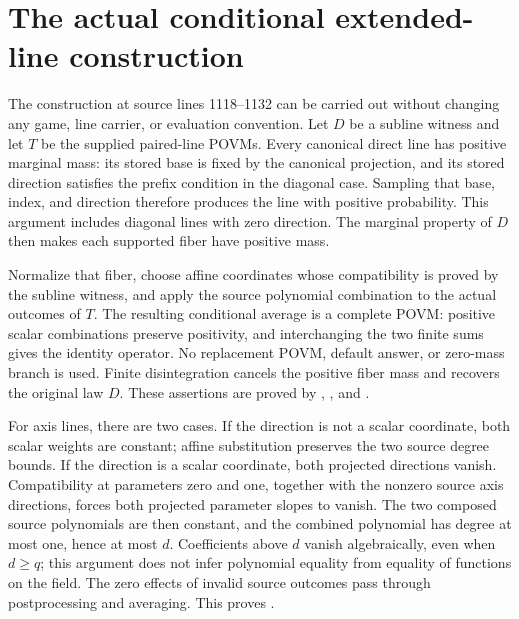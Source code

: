 \documentclass[11pt]{article}
\begin{document}
\section{The actual conditional extended-line construction}

The construction at source lines 1118--1132 can be carried out without
changing any game, line carrier, or evaluation convention. Let $D$ be a
subline witness and let $T$ be the supplied paired-line POVMs. Every
canonical direct line has positive marginal mass: its stored base is fixed
by the canonical projection, and its stored direction satisfies the prefix
condition in the diagonal case. Sampling that base, index, and direction
therefore produces the line with positive probability. This argument
includes diagonal lines with zero direction. The marginal property of $D$
then makes each supported fiber have positive mass.

Normalize that fiber, choose affine coordinates whose compatibility is
proved by the subline witness, and apply the source polynomial combination
to the actual outcomes of $T$. The resulting conditional average is a
complete POVM: positive scalar combinations preserve positivity, and
interchanging the two finite sums gives the identity operator. No
replacement POVM, default answer, or zero-mass branch is used. Finite
disintegration cancels the positive fiber mass and recovers the original
law $D$. These assertions are proved by
,
, and
.

For axis lines, there are two cases. If the direction is not a scalar
coordinate, both scalar weights are constant; affine substitution preserves
the two source degree bounds. If the direction is a scalar coordinate,
both projected directions vanish. Compatibility at parameters zero and one,
together with the nonzero source axis directions, forces both projected
parameter slopes to vanish. The two composed source polynomials are then
constant, and the combined polynomial has degree at most one, hence at most
$d$. Coefficients above $d$ vanish algebraically, even when $d\ge q$;
this argument does not infer polynomial equality from equality of functions
on the field. The zero effects of invalid source outcomes pass through
postprocessing and averaging. This proves
.
\end{document}
